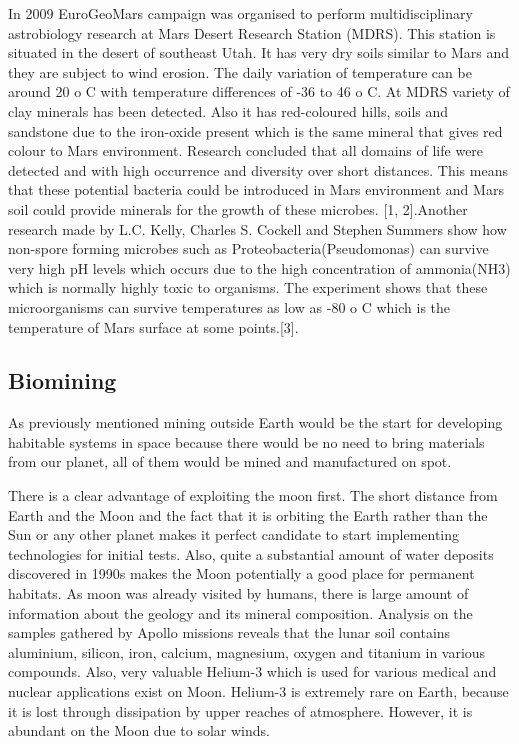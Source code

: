 \documentclass[12pt]{article}
\begin{document}
In 2009 EuroGeoMars campaign was organised to perform multidisciplinary astrobiology research at Mars Desert Research Station (MDRS). This station is situated in the desert of southeast Utah.\cite{} It has very dry soils similar to Mars and they are subject to wind erosion. The daily variation of temperature can be around 20 o C with temperature differences of -36 to 46 o C.
At MDRS variety of clay minerals has been detected. Also it has red-coloured hills, soils and sandstone due to the iron-oxide present which is the same mineral that gives red colour to Mars environment. Research concluded that all domains of life were detected and with high occurrence and diversity over short distances. This means that these potential bacteria could be introduced in Mars environment and Mars soil could provide minerals for the growth of these microbes. [1, 2].Another research made by L.C. Kelly, Charles S. Cockell and Stephen Summers show how non-spore forming microbes such as Proteobacteria(Pseudomonas) can survive very high pH levels which occurs due to the high concentration of ammonia(NH3) which is normally highly toxic to organisms. The experiment shows that these microorganisms can survive temperatures as low as -80 o C which is the temperature of Mars surface at some
points.\cite{}[3].


\subsection{Biomining}
As previously mentioned mining outside Earth would be the start for developing habitable systems in space because there would be no need to bring materials from our planet, all of them would be mined and manufactured on spot.

There is a clear advantage of exploiting the moon first. The short distance from Earth and the Moon and the fact that it is orbiting the Earth rather than the Sun or any other planet makes it perfect candidate to start implementing technologies for initial tests.\cite{} Also, quite a substantial amount of water deposits discovered in 1990s makes the Moon potentially a good place for
permanent habitats. As moon was already visited by humans, there is large amount of information about the geology and its mineral composition. Analysis on the samples gathered by Apollo missions reveals that the lunar soil contains aluminium, silicon, iron, calcium, magnesium, oxygen and titanium in various compounds.\cite{} Also, very valuable Helium-3 which is used for various medical and nuclear applications exist on Moon. Helium-3 is extremely rare on
Earth, because it is lost through dissipation by upper reaches of atmosphere. However, it is abundant on the Moon due to solar winds.
\end{document}
